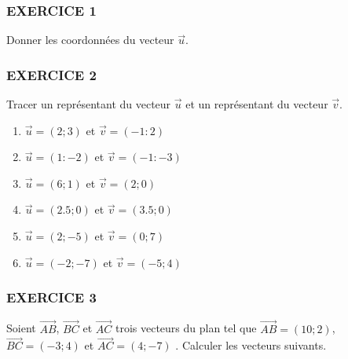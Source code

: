 \documentclass[10pt]{article}
\begin{document}
\setlength{\columnseprule}{1pt}

\subsubsection*{EXERCICE 1}

Donner les coordonnées du vecteur $\overrightarrow{u}$.

\begin{figure}[H]
  \centering
\end{figure}

\subsubsection*{EXERCICE 2}

Tracer un représentant du vecteur $\overrightarrow{u}$ et un représentant du vecteur $\overrightarrow{v}$.

\begin{figure}[H]
  \centering
\end{figure}

\begin{multicols}{2}
  \begin{enumerate}
  \item $\overrightarrow{u} = ( 2 ;  3)$ et $\overrightarrow{v} = (-1 :  2)$
  \item $\overrightarrow{u} = (1 : - 2)$ et $\overrightarrow{v} = (-1 :  -3)$
  \item $\overrightarrow{u} = ( 6 ;  1)$ et $\overrightarrow{v} = ( 2 ;  0)$
  \item $\overrightarrow{u} = ( 2.5 ;  0)$ et $\overrightarrow{v} = ( 3.5 ;  0)$
  \item $\overrightarrow{u} = ( 2 ; -5)$ et $\overrightarrow{v} = ( 0 ;  7)$
  \item $\overrightarrow{u} = ( -2 ; -7)$ et $\overrightarrow{v} = ( -5 ;  4)$
  \end{enumerate}
\end{multicols}

\subsubsection*{EXERCICE 3}
Soient $\overrightarrow{AB}$, $\overrightarrow{BC}$ et $\overrightarrow{AC}$ trois vecteurs du plan tel que $\overrightarrow{AB} = (10 ; 2)$, $\overrightarrow{BC} = (-3 ; 4)$ et $\overrightarrow{AC} = (4 ; -7)$   . Calculer les vecteurs suivants.
\end{document}
